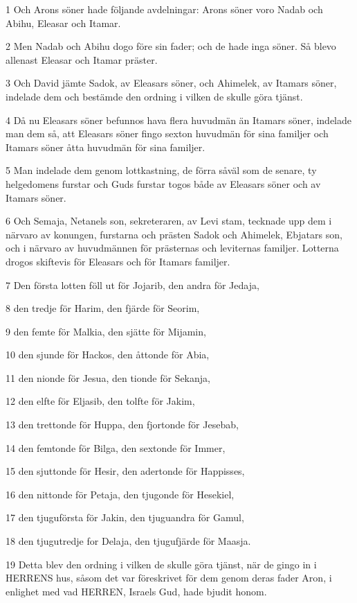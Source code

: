 \par 1 Och Arons söner hade följande avdelningar: Arons söner voro Nadab och Abihu, Eleasar och Itamar.
\par 2 Men Nadab och Abihu dogo före sin fader; och de hade inga söner. Så blevo allenast Eleasar och Itamar präster.
\par 3 Och David jämte Sadok, av Eleasars söner, och Ahimelek, av Itamars söner, indelade dem och bestämde den ordning i vilken de skulle göra tjänst.
\par 4 Då nu Eleasars söner befunnos hava flera huvudmän än Itamars söner, indelade man dem så, att Eleasars söner fingo sexton huvudmän för sina familjer och Itamars söner åtta huvudmän för sina familjer.
\par 5 Man indelade dem genom lottkastning, de förra såväl som de senare, ty helgedomens furstar och Guds furstar togos både av Eleasars söner och av Itamars söner.
\par 6 Och Semaja, Netanels son, sekreteraren, av Levi stam, tecknade upp dem i närvaro av konungen, furstarna och prästen Sadok och Ahimelek, Ebjatars son, och i närvaro av huvudmännen för prästernas och leviternas familjer. Lotterna drogos skiftevis för Eleasars och för Itamars familjer.
\par 7 Den första lotten föll ut för Jojarib, den andra för Jedaja,
\par 8 den tredje för Harim, den fjärde för Seorim,
\par 9 den femte för Malkia, den sjätte för Mijamin,
\par 10 den sjunde för Hackos, den åttonde för Abia,
\par 11 den nionde för Jesua, den tionde för Sekanja,
\par 12 den elfte för Eljasib, den tolfte för Jakim,
\par 13 den trettonde för Huppa, den fjortonde för Jesebab,
\par 14 den femtonde för Bilga, den sextonde för Immer,
\par 15 den sjuttonde för Hesir, den adertonde för Happisses,
\par 16 den nittonde för Petaja, den tjugonde för Hesekiel,
\par 17 den tjuguförsta för Jakin, den tjuguandra för Gamul,
\par 18 den tjugutredje for Delaja, den tjugufjärde för Maasja.
\par 19 Detta blev den ordning i vilken de skulle göra tjänst, när de gingo in i HERRENS hus, såsom det var föreskrivet för dem genom deras fader Aron, i enlighet med vad HERREN, Israels Gud, hade bjudit honom.
